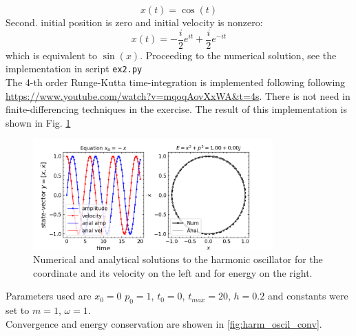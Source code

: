 \documentclass{article}
\begin{document}
\begin{equation}
	x(t) = \cos(t)
\end{equation}
Second. initial position is zero and initial velocity is nonzero:
\begin{equation}
	x(t) = -\frac{i}{2}e^{it} + \frac{i}{2}e^{-it}
\end{equation}
which is equivalent to $\sin(x)$.
Proceeding to the numerical solution, see the implementation in script \texttt{ex2.py} \\
The 4-th order Runge-Kutta time-integration is implemented following following \url{https://www.youtube.com/watch?v=mqoqAovXxWA&t=4s}. There is not need in finite-differencing techniques in the exercise. The result of this implementation is shown in Fig. \ref{fig:harm_oscil_num_sol}

\begin{figure}[t]
	\label{fig:harm_oscil_num_sol}
	\centering 
	\includegraphics[width=0.82\textwidth]{./fig2/harmonic_oscillator.png}
	\caption{Numerical and analytical solutions to  the harmonic oscillator for the coordinate and its velocity on the left and for energy on the right.}
\end{figure}

Parameters used are $x_0=0$ $p_0=1$, $t_0=0$, $t_{max}=20$, $h=0.2$ and constants were set to $m=1$, $\omega=1$. \\
Convergence and energy conservation are showen in \ref{fig:harm_oscil_conv}.
\end{document}
